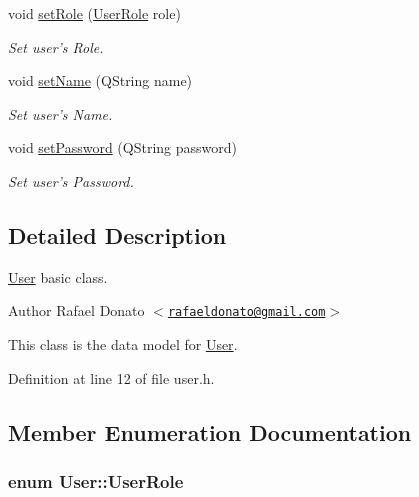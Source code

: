 \begin{DoxyCompactItemize}
void \hyperlink{class_user_a5b8189e98500dcad4801ed0e6f9a9388}{set\-Role} (\hyperlink{class_user_a43f49d6a3bf5f000aea476bc641949b0}{\-User\-Role} role)
\begin{DoxyCompactList}\small\item\em \-Set user's \-Role. \end{DoxyCompactList}\item 
void \hyperlink{class_user_afd2983930e39003d6d65a909bf36f8b7}{set\-Name} (\-Q\-String name)
\begin{DoxyCompactList}\small\item\em \-Set user's \-Name. \end{DoxyCompactList}\item 
void \hyperlink{class_user_a2fa7106fd6d96c663e34ebe82526d5ee}{set\-Password} (\-Q\-String password)
\begin{DoxyCompactList}\small\item\em \-Set user's \-Password. \end{DoxyCompactList}\end{DoxyCompactItemize}


\subsection{\-Detailed \-Description}
\hyperlink{class_user}{\-User} basic class. 

\begin{DoxyAuthor}{\-Author}
\-Rafael \-Donato $<$\href{mailto:rafaeldonato@gmail.com}{\tt rafaeldonato@gmail.\-com}$>$
\end{DoxyAuthor}
\-This class is the data model for \hyperlink{class_user}{\-User}. 

\-Definition at line 12 of file user.\-h.



\subsection{\-Member \-Enumeration \-Documentation}
\hypertarget{class_user_a43f49d6a3bf5f000aea476bc641949b0}{
\subsubsection[{\-User\-Role}]{\setlength{\rightskip}{0pt plus 5cm}enum {\bf \-User\-::\-User\-Role}}}\label{class_user_a43f49d6a3bf5f000aea476bc641949b0}



